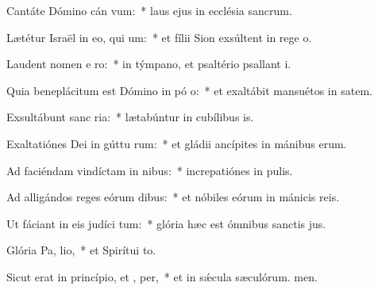 \item Cantáte Dómino cán vum:~* laus ejus in ecclésia sancrum.
\item Lætétur Israël in eo, qui  um:~* et fílii Sion exsúltent in rege o.
\item Laudent nomen e  ro:~* in týmpano, et psaltério psallant i.
\item Quia beneplácitum est Dómino in pó o:~* et exaltábit mansuétos in satem.
\item Exsultábunt sanc  ria:~* lætabúntur in cubílibus is.
\item Exaltatiónes Dei in gúttu rum:~* et gládii ancípites in mánibus erum.
\item Ad faciéndam vindíctam in nibus:~* increpatiónes in pulis.
\item Ad alligándos reges eórum  dibus:~* et nóbiles eórum in mánicis reis.
\item Ut fáciant in eis judíci tum:~* glória hæc est ómnibus sanctis jus.
\item Glória Pa,  lio,~* et Spirítui to.
\item Sicut erat in princípio, et ,  per,~* et in sǽcula sæculórum. men.
